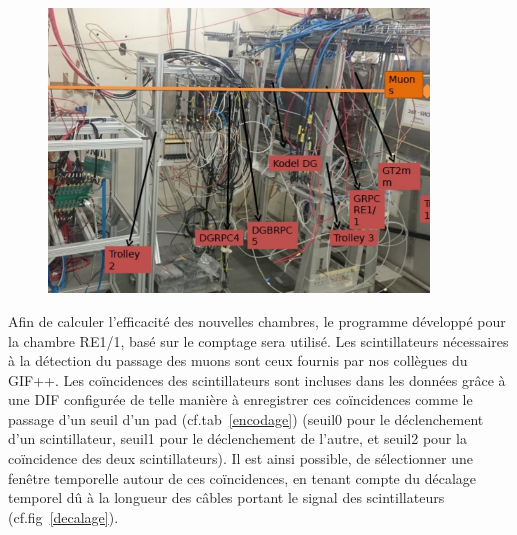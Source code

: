 \begin{figure}[ht!]
	\centering
	\includegraphics[width=0.90\textwidth]{GLA/setup.png}
	\label{bati}
\end{figure}

Afin de calculer l'efficacité des nouvelles chambres, le programme développé pour la chambre RE1/1, basé sur le comptage sera utilisé. Les scintillateurs nécessaires à la détection du passage des muons sont ceux fournis par nos collègues du GIF++. Les coïncidences des scintillateurs sont incluses dans les données grâce à une DIF configurée de telle manière à enregistrer ces coïncidences comme le passage d'un seuil d'un pad (cf.tab~\ref{encodage}) (seuil0 pour le déclenchement d'un scintillateur, seuil1 pour le déclenchement de l'autre, et seuil2 pour la coïncidence des deux scintillateurs). Il est ainsi possible, de sélectionner une fenêtre temporelle autour de ces coïncidences, en tenant compte du décalage temporel dû à la longueur des câbles portant le signal des scintillateurs (cf.fig~\ref{decalage}). 

